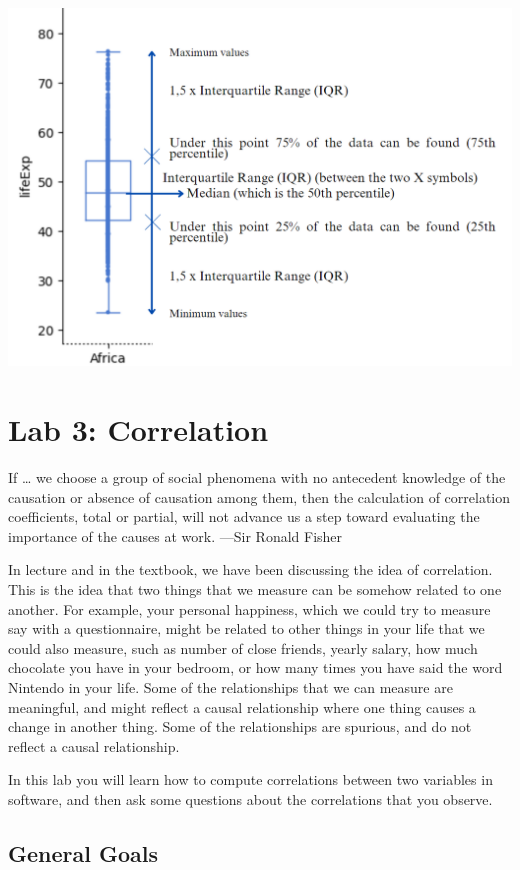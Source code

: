 \documentclass[
]{book}
\begin{document}
\includegraphics{img/ch2/boxplot.png}

\hypertarget{lab-3-correlation}{%
\chapter{Lab 3: Correlation}\label{lab-3-correlation}}

{
If \ldots{} we choose a group of social phenomena with no antecedent knowledge of the causation or absence of causation among them, then the calculation of correlation coefficients, total or partial, will not advance us a step toward evaluating the importance of the causes at work.
---Sir Ronald Fisher
}

In lecture and in the textbook, we have been discussing the idea of correlation. This is the idea that two things that we measure can be somehow related to one another. For example, your personal happiness, which we could try to measure say with a questionnaire, might be related to other things in your life that we could also measure, such as number of close friends, yearly salary, how much chocolate you have in your bedroom, or how many times you have said the word Nintendo in your life. Some of the relationships that we can measure are meaningful, and might reflect a causal relationship where one thing causes a change in another thing. Some of the relationships are spurious, and do not reflect a causal relationship.

In this lab you will learn how to compute correlations between two variables in software, and then ask some questions about the correlations that you observe.

\hypertarget{general-goals-2}{%
\section{General Goals}\label{general-goals-2}}
\end{document}
